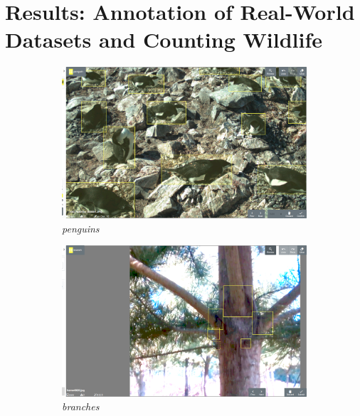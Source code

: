\chapter{Results: Annotation of Real-World Datasets and Counting Wildlife}
\label{chap:annotation} 

\begin{figure}[htbp]
\centering
\begin{subfigure}[t]{0.24\linewidth}
  \includegraphics[width=1.0\linewidth]{figures/annotation/screenshots/penguins2.png}
   \caption{\emph{penguins}}
\end{subfigure}%
\begin{subfigure}[t]{0.24\linewidth}
  \includegraphics[width=1.0\linewidth]{figures/annotation/screenshots/branches3.png}
   \caption{\emph{branches}}
\end{subfigure}%
\begin{subfigure}[t]{0.24\linewidth}

\end{subfigure}
\end{figure}
